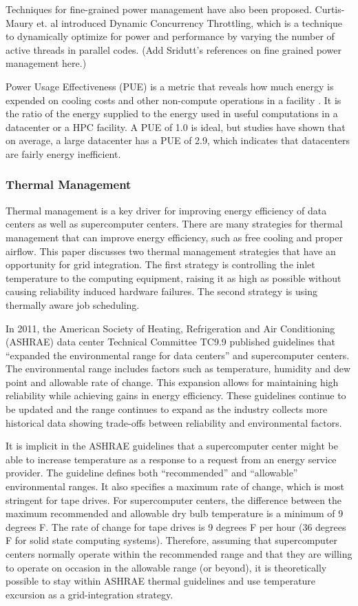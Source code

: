 Techniques for fine-grained power management have also been proposed.
Curtis-Maury et. al \cite{Curtis1,Curtis2,Curtis3} introduced Dynamic
Concurrency Throttling, which is a technique to dynamically optimize for power
and performance by varying the number of active threads in parallel codes. (Add
Sridutt's references on fine grained power management here.)

Power Usage Effectiveness (PUE) is a metric that reveals how much energy is
expended on cooling costs and other non-compute operations in a facility
\cite{Niccolai}. It is the ratio of the energy supplied to the energy used in
useful computations in a datacenter or a HPC facility. A PUE of 1.0 is ideal,
but studies have shown that on average, a large datacenter has a PUE of 2.9,
which indicates that datacenters are fairly energy inefficient. 

\subsubsection{Thermal Management}

Thermal management is a key driver for improving energy efficiency of data
centers as well as supercomputer centers.  There are many strategies for thermal
management that can improve energy efficiency, such as free cooling and proper
airflow.  This paper discusses two thermal management strategies that have an
opportunity for grid integration.  The first strategy is controlling the inlet
temperature to the computing equipment, raising it as high as possible without
causing reliability induced hardware failures.  The second strategy is using
thermally aware job scheduling.

In 2011, the American Society of Heating, Refrigeration and Air Conditioning
(ASHRAE) data center Technical Committee TC9.9 published guidelines that
“expanded the environmental range for data centers” and supercomputer
centers. The environmental range includes factors such as temperature, humidity
and dew point and allowable rate of change.  This expansion allows for
maintaining high reliability while achieving gains in energy efficiency.  These
guidelines continue to be updated and the range continues to expand as the
industry collects more historical data showing trade-offs between reliability
and environmental factors.

It is implicit in the ASHRAE guidelines that a supercomputer center might be
able to increase temperature as a response to a request from an energy service
provider.  The guideline defines both “recommended” and
“allowable” environmental ranges.  It also specifies a maximum rate of
change, which is most stringent for tape drives.  For supercomputer centers, the
difference between the maximum recommended and allowable dry bulb temperature is
a minimum of 9 degrees F.  The rate of change for tape drives is 9 degrees F per
hour (36 degrees F for solid state computing systems).   Therefore, assuming
that supercomputer centers normally operate within the recommended range and
that they are willing to operate on occasion in the allowable range (or beyond),
it is theoretically possible to stay within ASHRAE thermal guidelines and use
temperature excursion as a grid-integration strategy.  

